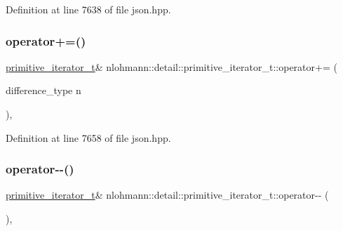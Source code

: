 Definition at line 7638 of file json.\+hpp.

\mbox{\label{classnlohmann_1_1detail_1_1primitive__iterator__t_aee01535df0b3b40137d9241029a9a203}} 
\subsubsection{\texorpdfstring{operator+=()}{operator+=()}}
{\footnotesize\ttfamily \mbox{\hyperlink{classnlohmann_1_1detail_1_1primitive__iterator__t}{primitive\+\_\+iterator\+\_\+t}}\& nlohmann\+::detail\+::primitive\+\_\+iterator\+\_\+t\+::operator+= (\begin{DoxyParamCaption}\item[{difference\+\_\+type}]{n }\end{DoxyParamCaption})\hspace{0.3cm}{\ttfamily [inline]}, {\ttfamily [noexcept]}}



Definition at line 7658 of file json.\+hpp.

\mbox{\label{classnlohmann_1_1detail_1_1primitive__iterator__t_abecbf0c73c7fe963a699738065177bc3}} 
\subsubsection{\texorpdfstring{operator-\/-\/()}{operator--()}\hspace{0.1cm}{\footnotesize\ttfamily [1/2]}}
{\footnotesize\ttfamily \mbox{\hyperlink{classnlohmann_1_1detail_1_1primitive__iterator__t}{primitive\+\_\+iterator\+\_\+t}}\& nlohmann\+::detail\+::primitive\+\_\+iterator\+\_\+t\+::operator-\/-\/ (\begin{DoxyParamCaption}{ }\end{DoxyParamCaption})\hspace{0.3cm}{\ttfamily [inline]}, {\ttfamily [noexcept]}}



